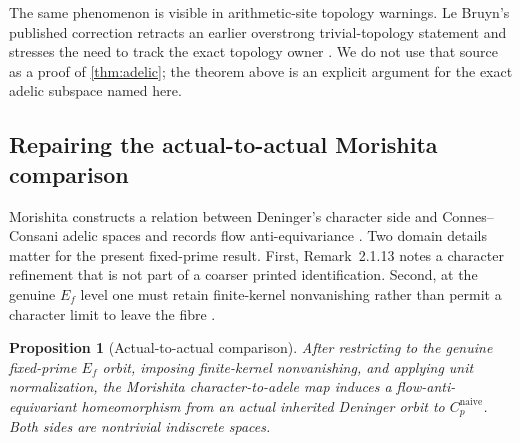 \documentclass[11pt]{article}
\newtheorem{proposition}[theorem]{Proposition}
\theoremstyle{definition}
\begin{document}
The same phenomenon is visible in arithmetic-site topology warnings.  Le Bruyn's published correction retracts an earlier overstrong trivial-topology statement and stresses the need to track the exact topology owner \cite[Theorem~1, printed p.~2/physical p.~3; correction acknowledgement, printed p.~9/physical p.~10]{LeBruyn2016}.  We do not use that source as a proof of \cref{thm:adelic}; the theorem above is an explicit argument for the exact adelic subspace named here.

\subsection{Repairing the actual-to-actual Morishita comparison}

Morishita constructs a relation between Deninger's character side and Connes--Consani adelic spaces and records flow anti-equivariance \cite[Eq.~(2.2.7) and surrounding theorems, physical pp.~14--17]{Morishita2026}.  Two domain details matter for the present fixed-prime result.  First, Remark~2.1.13 notes a character refinement that is not part of a coarser printed identification.  Second, at the genuine \(E_f\) level one must retain finite-kernel nonvanishing rather than permit a character limit to leave the fibre \cite[Remark~2.1.13, physical p.~13; Lemmas~3.4--3.5 and Theorem~3.6, pp.~23--25]{Morishita2026}.

\begin{proposition}[Actual-to-actual comparison]\label{prop:morishita}
After restricting to the genuine fixed-prime \(E_f\) orbit, imposing finite-kernel nonvanishing, and applying unit normalization, the Morishita character-to-adele map induces a flow-anti-equivariant homeomorphism from an actual inherited Deninger orbit to \(C_p^{\mathrm{naive}}\).  Both sides are nontrivial indiscrete spaces.
\end{proposition}
\end{document}
